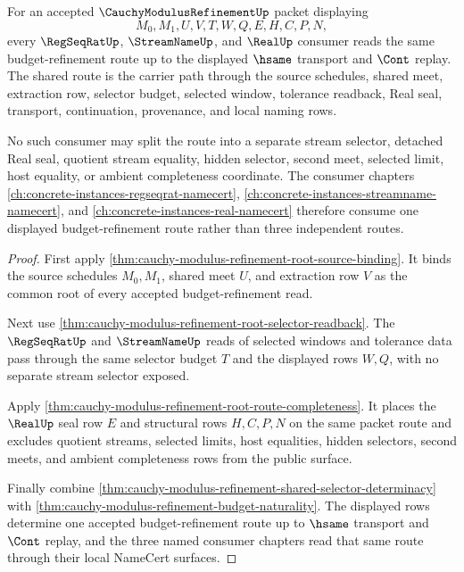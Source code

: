 \begin{theorem}
\label{thm:cauchy-modulus-refinement-regseq-streamname-real-coherence}
For an accepted $\CauchyModulusRefinementUp$ packet displaying
$$
M_0,M_1,U,V,T,W,Q,E,H,C,P,N,
$$
every $\RegSeqRatUp$, $\StreamNameUp$, and $\RealUp$ consumer reads the same budget-refinement route up to the displayed $\hsame$ transport and $\Cont$ replay. The shared route is the carrier path through the source schedules, shared meet, extraction row, selector budget, selected window, tolerance readback, Real seal, transport, continuation, provenance, and local naming rows.

No such consumer may split the route into a separate stream selector, detached Real seal, quotient stream equality, hidden selector, second meet, selected limit, host equality, or ambient completeness coordinate. The consumer chapters \autoref{ch:concrete-instances-regseqrat-namecert}, \autoref{ch:concrete-instances-streamname-namecert}, and \autoref{ch:concrete-instances-real-namecert} therefore consume one displayed budget-refinement route rather than three independent routes.
\end{theorem}
\begin{proof}
First apply \autoref{thm:cauchy-modulus-refinement-root-source-binding}. It binds the source schedules $M_0,M_1$, shared meet $U$, and extraction row $V$ as the common root of every accepted budget-refinement read.

Next use \autoref{thm:cauchy-modulus-refinement-root-selector-readback}. The $\RegSeqRatUp$ and $\StreamNameUp$ reads of selected windows and tolerance data pass through the same selector budget $T$ and the displayed rows $W,Q$, with no separate stream selector exposed.

Apply \autoref{thm:cauchy-modulus-refinement-root-route-completeness}. It places the $\RealUp$ seal row $E$ and structural rows $H,C,P,N$ on the same packet route and excludes quotient streams, selected limits, host equalities, hidden selectors, second meets, and ambient completeness rows from the public surface.

Finally combine \autoref{thm:cauchy-modulus-refinement-shared-selector-determinacy} with \autoref{thm:cauchy-modulus-refinement-budget-naturality}. The displayed rows determine one accepted budget-refinement route up to $\hsame$ transport and $\Cont$ replay, and the three named consumer chapters read that same route through their local NameCert surfaces.
\end{proof}

